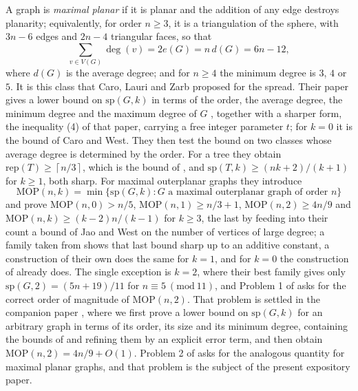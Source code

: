 \documentclass[12pt,a4paper]{article}%
\begin{document}


A graph is \emph{maximal planar} if it is planar and the addition of any edge destroys planarity;
equivalently, for order $n\geq 3$, it is a triangulation of the sphere, with $3n-6$ edges and $2n-4$
triangular faces, so that
\[
\sum_{v\in V(G)}\deg (v)=2e(G)=n\,d(G)=6n-12 ,
\]
where $d(G)$ is the average degree; and for $n\geq 4$ the minimum degree is $3$, $4$ or $5$. It is this class that Caro, Lauri and Zarb proposed for the spread. Their paper
\cite{CaroLauriZarb} gives a lower bound on $\mathrm{sp}(G,k)$ in terms of the order, the average
degree, the minimum degree and the maximum degree of $G$ \cite[Theorem 2.1]{CaroLauriZarb}, together
with a sharper form, the inequality (4) of that paper, carrying a free integer parameter $t$; for
$k=0$ it is the bound of Caro and West. They then test the bound on two classes whose average degree
is determined by the order. For a tree they obtain $\mathrm{rep}(T)\geq \left\lceil n/3\right\rceil $,
which is the bound of \cite{CaroWest}, and $\mathrm{sp}(T,k)\geq (nk+2)/(k+1)$ for $k\geq 1$, both
sharp. For maximal outerplanar graphs they introduce
\[
\mathrm{MOP}(n,k)=\min \{\mathrm{sp}(G,k):G\text{ a maximal outerplanar graph of order }n\}
\]
and prove $\mathrm{MOP}(n,0)>n/5$, $\mathrm{MOP}(n,1)\geq n/3+1$, $\mathrm{MOP}(n,2)\geq 4n/9$ and
$\mathrm{MOP}(n,k)\geq (k-2)n/(k-1)$ for $k\geq 3$, the last by feeding into their count a bound of Jao
and West \cite{JaoWest} on the number of vertices of large degree; a family taken from
\cite{JaoWest} shows that last bound sharp up to an additive constant, a construction of their own does
the same for $k=1$, and for $k=0$ the construction of \cite{CaroWest} already does. The single
exception is $k=2$, where their best family gives only
$\mathrm{sp}(G,2)=(5n+19)/11$ for $n\equiv 5\ (\mathrm{mod}\ 11)$, and Problem 1 of
\cite{CaroLauriZarb} asks for the correct order of magnitude of $\mathrm{MOP}(n,2)$. That problem is
settled in the companion paper \cite{P1}, where we first prove a lower bound on $\mathrm{sp}(G,k)$ for
an arbitrary graph in terms of its order, its size and its minimum degree, containing the bounds of
\cite{CaroLauriZarb,CaroWest} and refining them by an explicit error term, and then obtain
$\mathrm{MOP}(n,2)=4n/9+O(1)$. Problem 2 of \cite{CaroLauriZarb} asks for the analogous quantity for
maximal planar graphs, and that problem is the subject of the present expository paper.
\end{document}
